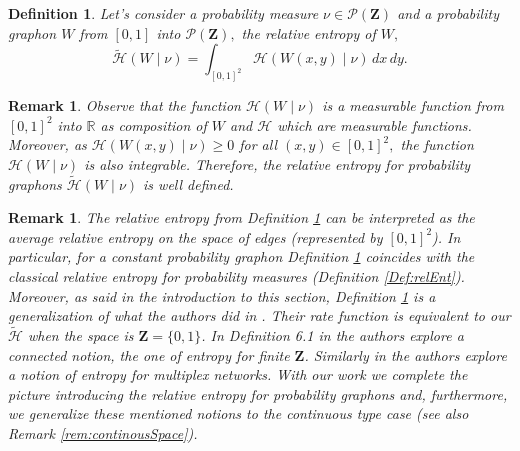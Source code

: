 \documentclass[12pt,twoside,a4paper]{article}
\newtheorem{definition}[theorem]{Definition}
\newtheorem{remark}[theorem]{Remark}
\newcommand{\Space}{\mathbf{Z}}
\begin{document}
\begin{definition}\label{DefRelatProbGraphon}
Let's consider a probability measure $\nu\in \mathcal{P}(\Space)$ and a probability graphon $W$ from $[0,1]$ into $\mathcal{P}(\Space),$ the relative entropy of $W,$
\[
\widetilde{\mathcal{H}}(W \mid \nu) = \int_{[0,1]^2} \mathcal{H}(W(x,y) \mid \nu) \, dx \, dy.
\]
\end{definition}
\begin{remark}
Observe that the function $\mathcal{H}(W \mid \nu)$ is a measurable function from $[0,1]^2$ into $\mathbb{R}$ as composition of $W$ and $\mathcal{H}$ which are measurable functions. Moreover, as $\mathcal{H}(W(x,y) \mid \nu)\geq 0$ for all $(x,y)\in [0,1]^2,$ the function $\mathcal{H}(W \mid \nu)$ is also integrable. Therefore, the relative entropy for probability graphons $\widetilde{\mathcal{H}}(W \mid \nu)$ is well defined.
\end{remark}
\begin{remark}
The relative entropy from Definition \ref{DefRelatProbGraphon} can be interpreted as the average relative entropy on the space of edges (represented by $[0,1]^2$). In particular, for a constant probability graphon Definition \ref{DefRelatProbGraphon} coincides with the classical relative entropy for probability measures (Definition \ref{Def:relEnt}).
Moreover, as said in the introduction to this section, Definition \ref{DefRelatProbGraphon} is a generalization of what the authors did in \cite{ChatterjeeVaradhan2011}. Their rate function is equivalent to our $\widetilde{\mathcal{H}}$ when the space is $\Space=\{0,1\}$.  In Definition 6.1 in \cite{falgasravry2016multicolour} the authors explore a connected notion, the one of entropy for finite $\Space$.  Similarly in \cite[Definition 5 and Definition 9]{skeja2024quantifyingmultivariategraphdependencies} the authors explore a notion of entropy for multiplex networks. With our work we complete the picture introducing the relative entropy for probability graphons and, furthermore, we generalize these mentioned notions to the continuous type case (see also Remark \ref{rem:continousSpace}).
\end{remark} 
\end{document}
